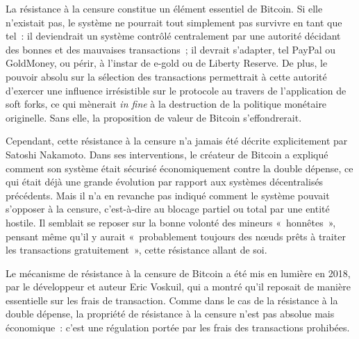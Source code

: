 La résistance à la censure constitue un élément essentiel de Bitcoin. Si elle n'existait pas, le système ne pourrait tout simplement pas survivre en tant que tel~: il deviendrait un système contrôlé centralement par une autorité décidant des bonnes et des mauvaises transactions~; il devrait s'adapter, tel PayPal ou GoldMoney, ou périr, à l'instar de e-gold ou de Liberty Reserve. De plus, le pouvoir absolu sur la sélection des transactions permettrait à cette autorité d'exercer  une influence irrésistible sur le protocole au travers de l'application de soft forks, ce qui mènerait \emph{in fine} à la destruction de la politique monétaire originelle. Sans elle, la proposition de valeur de Bitcoin s'effondrerait.

Cependant, cette résistance à la censure n'a jamais été décrite explicitement par Satoshi Nakamoto. Dans ses interventions, le créateur de Bitcoin a expliqué comment son système était sécurisé économiquement contre la double dépense, ce qui était déjà une grande évolution par rapport aux systèmes décentralisés précédents. Mais il n'a en revanche pas indiqué comment le système pouvait s'opposer à la censure, c'est-à-dire au blocage partiel ou total par une entité hostile. Il semblait se reposer sur la bonne volonté des mineurs «~honnêtes~», pensant même qu'il y aurait «~probablement toujours des nœuds prêts à traiter les transactions gratuitement~», cette résistance allant de soi.

Le mécanisme de résistance à la censure de Bitcoin a été mis en lumière en 2018, par le développeur et auteur Eric Voskuil, qui a montré qu'il reposait de manière essentielle sur les frais de transaction. Comme dans le cas de la résistance à la double dépense, la propriété de résistance à la censure n'est pas absolue mais économique~: c'est une régulation portée par les frais des transactions prohibées.

